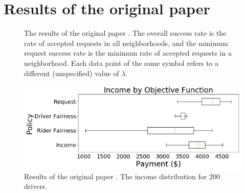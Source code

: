 \section{Results of the original paper}
\label{appendix:original paper}

\begin{figure}[ht!]
\centering
\captionsetup{justification=centering}
    \caption{The results of the original paper \cite{raman_data-driven_2021}. The overall success rate is the rate of accepted requests in all neighborhoods, and the minimum request success rate is the minimum rate of accepted requests in a neighborhood. Each data point of the same symbol refers to a different (unspecified) value of $\lambda$.}
    \label{success_rates_paper}
\end{figure}


\begin{figure}[ht!]
\centering
\includegraphics[width=.55\textwidth]{../openreview/Figures/200_driv_inc_paper.png}
\caption{Results of the original paper \cite{raman_data-driven_2021}. The income distribution for 200 drivers.}
\label{200_drivers_inc_paper}
\end{figure}
